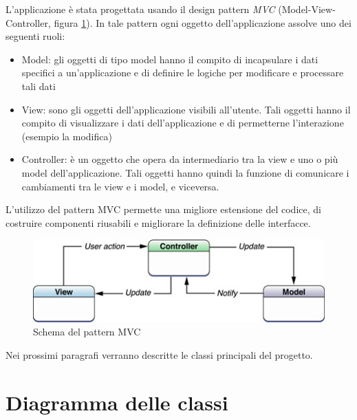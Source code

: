 L'applicazione è stata progettata usando il design pattern \emph{MVC} (Model-View-Controller, figura \ref{fig:mvc}). In tale pattern ogni oggetto dell'applicazione assolve uno dei seguenti ruoli:
\begin{itemize}
 \item Model: gli oggetti di tipo model hanno il compito di incapsulare i dati specifici a un'applicazione e di definire le logiche per modificare e processare tali dati
 \item View: sono gli oggetti dell'applicazione visibili all'utente. Tali oggetti hanno il compito di visualizzare i dati dell'applicazione e di permetterne l'interazione (esempio la modifica)
 \item Controller: è un oggetto che opera da intermediario tra la view e uno o più model dell'applicazione. Tali oggetti hanno quindi la funzione di comunicare i cambiamenti tra le view e i model, e viceversa.
\end{itemize}

L'utilizzo del pattern MVC permette una migliore estensione del codice, di costruire componenti riusabili e migliorare la definizione delle interfacce.

\begin{figure}[!htbp]
\centering
\includegraphics[scale=0.70]{architettura/mvc.png}
\caption{Schema del pattern MVC}
\label{fig:mvc}
\end{figure}

Nei prossimi paragrafi verranno descritte le classi principali del progetto.

\section{Diagramma delle classi}


